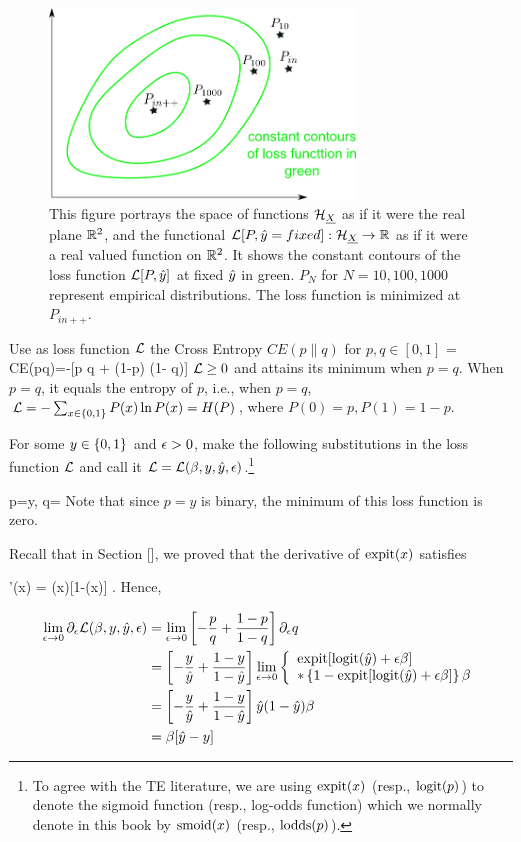 \begin{figure}[h!]
\centering
\includegraphics[width=3.2in]
{targeted-est/targeted-est.png}
\caption{
This figure portrays
the space of functions ${\cal H}_{\underline{X}}$
as if it were the real plane ${ \mathbb{R}}^2$,
and the functional ${\cal L}[P, {\hat{y}}=fixed]:{\cal H}_{\underline{X}}
\rightarrow{ \mathbb{R}}$
as if it were a real valued function on ${ \mathbb{R}}^2$.
It shows  the constant contours
of the loss function ${\cal L}[P, {\hat{y}}]$
at fixed ${\hat{y}}$ in green.
$P_N$ for $N=10, 100, 1000$
represent empirical distributions.
The loss function
is minimized at $P_{in++}$.
}
\label{fig-targeted-est}
\end{figure}

Use as loss function ${\cal L}$ the Cross Entropy
$CE(p\parallel q)$ for $p, q\in [0,1]$
\beq
\call = CE(p\parallel q)=-[p \ln q + (1-p) \ln(1- q)]
\eeq
${\cal L}\geq 0$ and attains its minimum when $p=q$.
When $p=q$, it equals the entropy of $p$,
i.e., when $p=q$, ${\cal L}=-\sum_{x\in \{0,1\}} P(x)\ln P(x)= H(P)$,
where $P(0)=p, P(1)=1-p$.

For some $y\in\{0,1\}$ and $\epsilon>0$,
make the following
substitutions
in the loss function ${\cal L}$
and call it ${\cal L}={\cal L}(\beta, y, {\hat{y}}, \epsilon)$.\footnote{To
agree with the TE literature,
we are using ${\rm expit}(x)$
(resp., ${\rm logit}(p)$) to denote
the sigmoid function (resp., log-odds function)
which we normally
denote in this book by
 ${\rm smoid}(x)$ (resp., ${\rm lodds}(p)$).}

\beq
p=y,
\quad
q= \expit[\logit(\haty) + \eps \beta ]
\eeq
Note that since $p=y$ is binary,
the minimum of this loss function is zero.

 Recall that in Section [], we proved that
 the derivative of ${\rm expit}(x)$ satisfies

\beq
\expit'(x) = \expit(x)[1-\expit(x)]
\;.
\eeq
Hence,

\begin{align}
\lim_{\epsilon\rightarrow 0}\partial_\epsilon {\cal L}(\beta, y, {\hat{y}}, \epsilon)
&=
\lim_{\epsilon\rightarrow 0}
\left[-\frac{p}{q} + \frac{1-p}{1-q}\right]\partial_\epsilon q
\\
&=
\left[-\frac{y}{{\hat{y}}} + \frac{1-y}{1-{\hat{y}}}\right]
\lim_{\epsilon\rightarrow 0}
\left\{
\begin{array}{l}
{\rm expit}[{\rm logit}({\hat{y}}) + \epsilon \beta ]
\\
*\left\{1-{\rm expit}[{\rm logit}({\hat{y}}) + \epsilon \beta ]\right\}
\beta
\end{array}
\right.
\\
&=
\left[-\frac{y}{{\hat{y}}} + \frac{1-y}{1-{\hat{y}}}\right]
{\hat{y}}(1-{\hat{y}})\beta
\\
&=
\beta[{\hat{y}}-y]
\end{align}

